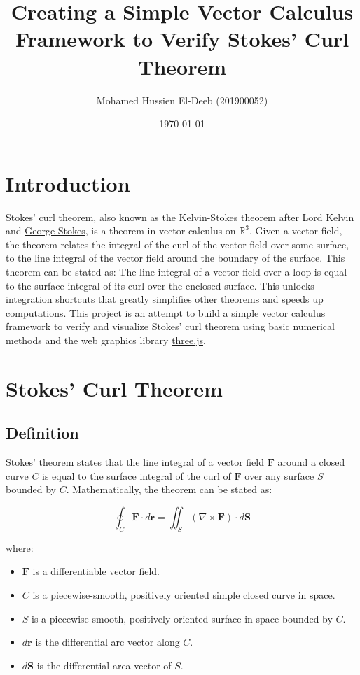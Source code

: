 \documentclass[12pt]{article}
\title{Creating a Simple Vector Calculus Framework to Verify Stokes' Curl Theorem}
\author{Mohamed Hussien El-Deeb (201900052)}
\date{\today}
\begin{document}
\maketitle
\tableofcontents
\hypersetup{linkcolor=RoyalBlue4}

\newpage
\section{Introduction}

Stokes' curl theorem, also known as the Kelvin-Stokes theorem after \href{https://en.wikipedia.org/wiki/Lord_Kelvin}{Lord Kelvin} and
\href{https://en.wikipedia.org/wiki/Sir_George_Stokes,_1st_Baronet}{George Stokes}, is a theorem in vector calculus on \({\displaystyle \mathbb {R} ^{3}}\). Given
a vector field, the theorem relates the integral of the curl of the vector field over some
surface, to the line integral of the vector field around the boundary of the surface. This theorem can be
stated as: The line integral of a vector field over a loop is equal to the surface
integral of its curl over the enclosed surface. This unlocks integration shortcuts that greatly simplifies other theorems and speeds up computations.
This project is an attempt to build a simple vector calculus framework to verify and visualize
Stokes' curl theorem using basic numerical methods and the web graphics library \href{https://threejs.org/}{three.js}.

\newpage
\section{Stokes' Curl Theorem}
\subsection{Definition}

Stokes' theorem states that the line integral of a vector field \(\mathbf{F}\) around a closed curve \(C\) is equal to the surface integral of the curl of \(\mathbf{F}\) over any surface \(S\) bounded by \(C\). Mathematically, the theorem can be stated as:

\[
\oint_{C} \mathbf{F} \cdot d\mathbf{r} = \iint_{S} (\nabla \times \mathbf{F}) \cdot d\mathbf{S}
\]

where:

\begin{itemize}
    \item \(\mathbf{F}\) is a differentiable vector field.
    \item \(C\) is a piecewise-smooth, positively oriented simple closed curve in space.
    \item \(S\) is a piecewise-smooth, positively oriented surface in space bounded by \(C\).
    \item \(d\mathbf{r}\) is the differential arc vector along \(C\).
    \item \(d\mathbf{S}\) is the differential area vector of \(S\).
\end{itemize}
\end{document}
